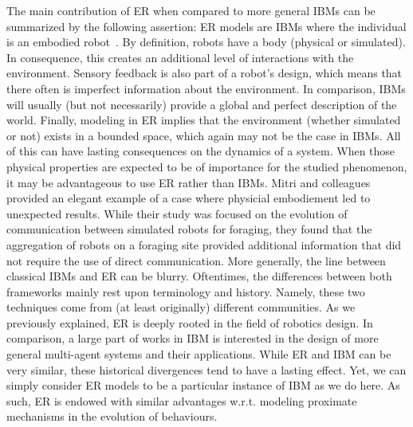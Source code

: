 


        The main contribution of ER when compared to more general IBMs can be summarized by the following assertion: ER models are IBMs where the individual is an embodied robot~\parencite{Mitri2013}. By definition, robots have a body (physical or simulated). In consequence, this creates an additional level of interactions with the environment. Sensory feedback is also part of a robot's design, which means that there often is imperfect information about the environment. In comparison, IBMs will usually (but not necessarily) provide a global and perfect description of the world. Finally, modeling in ER implies that the environment (whether simulated or not) exists in a bounded space, which again may not be the case in IBMs. All of this can have lasting consequences on the dynamics of a system. When those physical properties are expected to be of importance for the studied phenomenon, it may be advantageous to use ER rather than IBMs. Mitri and colleagues~\parencite{Mitri2009} provided an elegant example of a case where physicial embodiement led to unexpected results. While their study was focused on the evolution of communication between simulated robots for foraging, they found that the aggregation of robots on a foraging site provided additional information that did not require the use of direct communication. More generally, the line between classical IBMs and ER can be blurry. Oftentimes, the differences between both frameworks mainly rest upon terminology and history. Namely, these two techniques come from (at least originally) different communities. As we previously explained, ER is deeply rooted in the field of robotics design. In comparison, a large part of works in IBM is interested in the design of more general multi-agent systems and their applications. While ER and IBM can be very similar, these historical divergences tend to have a lasting effect. Yet, we can simply consider ER models to be a particular instance of IBM as we do here. As such, ER is endowed with similar advantages w.r.t. modeling proximate mechanisms in the evolution of behaviours.

